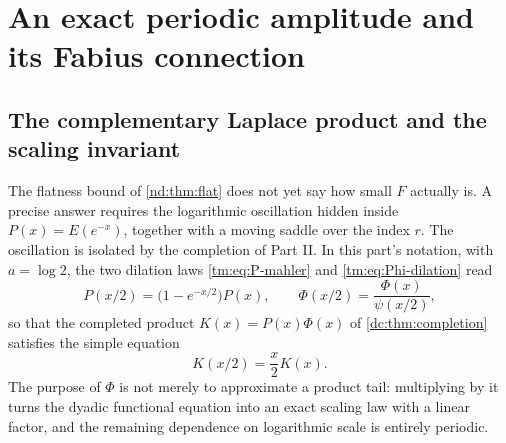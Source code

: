 \documentclass[11pt,a4paper,oneside,openany]{book}
\numberwithin{equation}{chapter}
\theoremstyle{definition}
\theoremstyle{remark}
\begin{document}
\chapter{An exact periodic amplitude and its Fabius connection}
\label{nd:sec:periodic}
\section{The complementary Laplace product and the scaling invariant}
The flatness bound of \cref{nd:thm:flat} does not yet say how small $F$
actually is. A precise answer requires the logarithmic oscillation hidden
inside $P(x)=E(e^{-x})$, together with a moving saddle over the index $r$.
The oscillation is isolated by the completion of Part II. In this part's
notation, with $a=\log2$, the two dilation laws \eqref{tm:eq:P-mahler} and
\eqref{tm:eq:Phi-dilation} read
\begin{equation}\label{nd:eq:AQscale}
 P(x/2)=\bigl(1-e^{-x/2}\bigr)P(x),\qquad
 \Phi(x/2)=\frac{\Phi(x)}{\psi(x/2)},
\end{equation}
so that the completed product $K(x)=P(x)\Phi(x)$ of
\cref{dc:thm:completion} satisfies the simple equation
\begin{equation}\label{nd:eq:Bscale}
 K(x/2)=\frac x2K(x).
\end{equation}
The purpose of $\Phi$ is not merely to approximate a product tail:
multiplying by it turns the dyadic functional equation into an exact scaling
law with a linear factor, and the remaining dependence on logarithmic scale
is entirely periodic.
\end{document}
